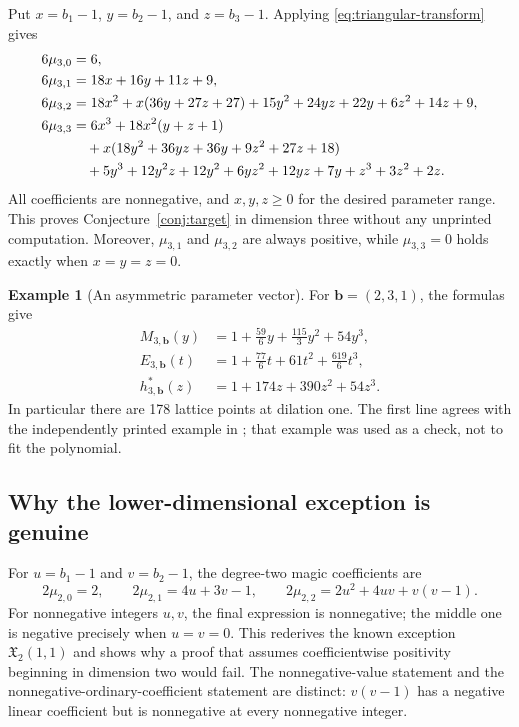 \documentclass[11pt]{article}
\theoremstyle{definition}
\newtheorem{example}[theorem]{Example}
\newcommand{\bb}{\mathbf b}
\newcommand{\X}{\mathfrak X}
\numberwithin{equation}{section}
\begin{document}
Put $x=b_1-1$, $y=b_2-1$, and $z=b_3-1$. Applying
\eqref{eq:triangular-transform} gives
\begin{align}
 6\mu_{3,0}&=6,\notag\\
 6\mu_{3,1}&=18x+16y+11z+9,\label{eq:cubic-mu1}\\
 6\mu_{3,2}&=18x^2+x(36y+27z+27)
       +15y^2+24yz+22y+6z^2+14z+9,\label{eq:cubic-mu2}\\
 6\mu_{3,3}&=6x^3+18x^2(y+z+1)\notag\\
 &\quad+x(18y^2+36yz+36y+9z^2+27z+18)\notag\\
 &\quad+5y^3+12y^2z+12y^2+6yz^2+12yz+7y
       +z^3+3z^2+2z.\label{eq:cubic-mu3}
\end{align}
All coefficients are nonnegative, and $x,y,z\ge0$ for the desired
parameter range. This proves Conjecture~\ref{conj:target} in dimension
three without any unprinted computation. Moreover, $\mu_{3,1}$ and
$\mu_{3,2}$ are always positive, while $\mu_{3,3}=0$ holds exactly when
$x=y=z=0$.

\begin{example}[An asymmetric parameter vector]
For $\bb=(2,3,1)$, the formulas give
\begin{align*}
 M_{3,\bb}(y)&=1+\frac{59}{6}y+\frac{115}{3}y^2+54y^3,\\
 E_{3,\bb}(t)&=1+\frac{77}{6}t+61t^2+\frac{619}{6}t^3,\\
 h^*_{3,\bb}(z)&=1+174z+390z^2+54z^3.
\end{align*}
In particular there are 178 lattice points at dilation one. The first line
agrees with the independently printed example in \cite[Section~8]{HLTV};
that example was used as a check, not to fit the polynomial.
\end{example}

\subsection{Why the lower-dimensional exception is genuine}
For $u=b_1-1$ and $v=b_2-1$, the degree-two magic coefficients are
\[
 2\mu_{2,0}=2,\qquad 2\mu_{2,1}=4u+3v-1,\qquad
 2\mu_{2,2}=2u^2+4uv+v(v-1).
\]
For nonnegative integers $u,v$, the final expression is nonnegative; the
middle one is negative precisely when $u=v=0$. This rederives the known
exception $\X_2(1,1)$ and shows why a proof that assumes coefficientwise
positivity beginning in dimension two would fail. The nonnegative-value
statement and the nonnegative-ordinary-coefficient statement are distinct:
$v(v-1)$ has a negative linear coefficient but is nonnegative at every
nonnegative integer.
\end{document}
